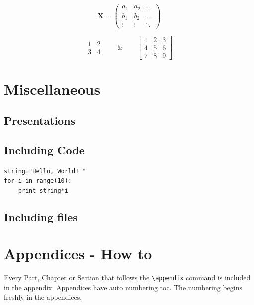 \documentclass[11pt,a4paper,twoside]{article}
\begin{document}
\begin{equation*}
\mathbf{X} = \left(
 \begin{array}{ccc}
 a_1 & a_2 & \ldots \\
 b_1 & b_2 & \ldots \\
 \vdots & \vdots & \ddots
 \end{array} \right)
\end{equation*}

\begin{equation}
  \begin{matrix}
  1 & 2 \\
  3 & 4
  \end{matrix} \qquad \& \qquad 
  \begin{bmatrix}
  1 & 2 & 3 \\
  4 & 5 & 6 \\
  7 & 8 & 9
  \end{bmatrix}
\end{equation}

\section{Miscellaneous}
\subsection{Presentations}
\subsection{Including Code}
\begin{lstlisting}
string="Hello, World! "
for i in range(10):
    print string*i
\end{lstlisting} 
\subsection{Including files}




\appendix
\section{Appendices - How to}
\label{append}
Every Part, Chapter or Section that follows the \verb+\appendix+ command is included in the appendix. Appendices have auto numbering too. The numbering begins freshly in the appendices. 
\end{document}
